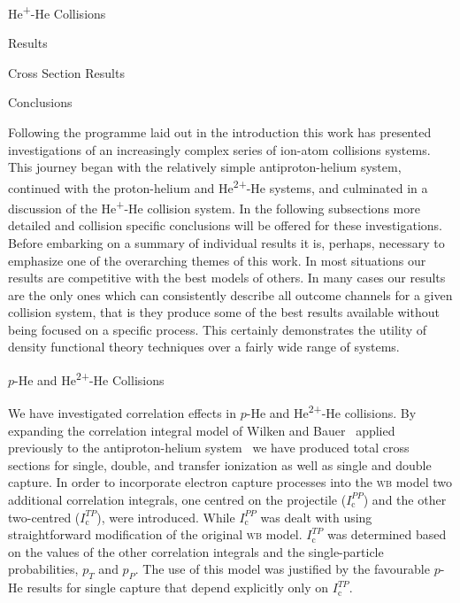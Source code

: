 \documentclass[letterpaper, 11 pt]{report}
\begin{document}
\begin{chapter}{\texorpdfstring{He\textsuperscript{+}}{He+}-He Collisions \label{chap:hephe}}
\begin{section}{Results \label{sec:hephe-disc}}
\begin{subsection}{Cross Section Results \label{sec:hephe-res}}
      \end{subsection}

   \end{section}

\end{chapter}

\begin{chapter}{Conclusions \label{chap:con}}

   Following the programme laid out in the introduction this work has presented investigations of an
   increasingly complex series of ion-atom collisions systems. This journey began with the relatively
   simple antiproton-helium system, continued with the proton-helium and He\textsuperscript{2+}-He
   systems, and culminated in a discussion of the He\textsuperscript{+}-He collision system. In the
   following subsections more detailed and collision specific conclusions will be offered for these
   investigations. Before embarking on a summary of individual results it is, perhaps, necessary to
   emphasize one of the overarching themes of this work. In most situations our results are competitive
   with the best models of others. In many cases our results are the only ones which can consistently
   describe all outcome channels for a given collision system, that is they produce some of the best
   results available without being focused on a specific process. This certainly demonstrates the
   utility of density functional theory techniques over a fairly wide range of systems.

   \begin{section}{\texorpdfstring{$p$}{p}-He and \texorpdfstring{He\textsuperscript{2+}}{He2+}-He
                   Collisions \label{sec:con-phe2p-he}}

      We have investigated correlation effects in $p$-He and He\textsuperscript{2+}-He collisions. By
      expanding the correlation integral model of Wilken and Bauer~\cite{wb} applied previously to the
      antiproton-helium system~\cite{pbarhe} we have produced total cross sections for single, double,
      and transfer ionization as well as single and double capture. In order to incorporate electron
      capture processes into the \textsc{wb} model two additional correlation integrals, one centred on
      the projectile ($I^{PP}_\mathrm{c}$) and the other two-centred ($I^{TP}_\mathrm{c}$), were
      introduced. While $I^{PP}_\mathrm{c}$ was dealt with using straightforward modification of the
      original \textsc{wb} model. $I^{TP}_\mathrm{c}$ was determined based on the values of the other
      correlation integrals and the single-particle probabilities, $p_T$ and $p_P$. The use of this
      model was justified by the favourable $p$-He results for single capture that depend explicitly
      only on $I^{TP}_\mathrm{c}$.


\end{section}
\end{chapter}
\end{document}
